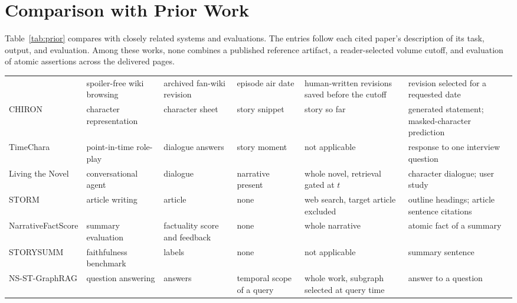 \section{Comparison with Prior Work}
\label{app:related}

Table~\ref{tab:prior} compares \sys with closely related systems and evaluations. The entries
follow each cited paper's description of its task, output, and evaluation. Among these works,
none combines a published reference artifact, a reader-selected volume cutoff, and evaluation
of atomic assertions across the delivered pages.

\begin{table}[t]
\centering\footnotesize
\setlength{\tabcolsep}{3pt}
\begin{tabularx}{\textwidth}{@{}Z{2.4cm}Z{1.9cm}Z{2.0cm}Z{1.65cm}>{\raggedright\arraybackslash}X>{\raggedright\arraybackslash}X@{}}
\toprule
{} &  &  &  &  &  \\
\midrule
\citet{jones2018spoilers} & spoiler-free wiki browsing & archived fan-wiki revision & episode air date & human-written revisions saved before the cutoff & revision selected for a requested date \\
CHIRON \citep{gurung2024chiron} & character representation & character sheet & story snippet & story so far & generated statement; masked-character prediction \\
TimeChara \citep{ahn2024timechara} & point-in-time role-play & dialogue answers & story moment & not applicable & response to one interview question \\
Living the Novel \citep{huang2025living} & conversational agent & dialogue & narrative present & whole novel, retrieval gated at $t$ & character dialogue; user study \\
STORM \citep{shao2024storm} & article writing & article & none & web search, target article excluded & outline headings; article sentence citations \\
Narrative\-Fact\-Score \citep{jeong2025narrativefactscore} & summary evaluation & factuality score and feedback & none & whole narrative & atomic fact of a summary \\
STORYSUMM \citep{subbiah2024storysumm} & faithfulness benchmark & labels & none & not applicable & summary sentence \\
NS-ST-GraphRAG \citep{lin2026nsst} & question answering & answers & temporal scope of a query & whole work, subgraph selected at query time & answer to a question \\

\end{tabularx}
\end{table}
